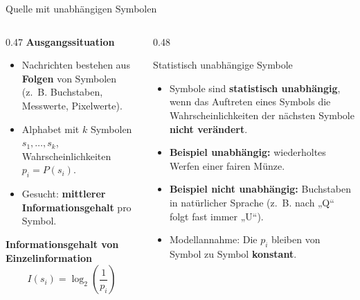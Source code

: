 \begin{frame}{Quelle mit unabhängigen Symbolen}
  \small
\begin{columns}[T]
  \begin{column}{0.47\textwidth}
    \textbf{Ausgangssituation}

    \begin{itemize}
      \item Nachrichten bestehen aus \textbf{Folgen} von Symbolen
            (z.~B. Buchstaben, Messwerte, Pixelwerte).
      \item Alphabet mit \(k\) Symbolen \(s_1,\dots,s_k\), Wahrscheinlichkeiten \(p_i = P(s_i)\).
      \item Gesucht: \textbf{mittlerer Informationsgehalt} pro Symbol.
    \end{itemize}

    \vspace{0.3cm}
    \textbf{Informationsgehalt von Einzelinformation}
    \[
      I(s_i) = \log_2\!\left(\frac{1}{p_i}\right)
    \]
  \end{column}

  \begin{column}{0.48\textwidth}
    \begin{blockDef}{\small Statistisch unabhängige Symbole}
      \begin{itemize}
        \item Symbole sind \textbf{statistisch unabhängig}, wenn das Auftreten eines Symbols
              die Wahrscheinlichkeiten der nächsten Symbole \textbf{nicht verändert}.
        \item \textbf{Beispiel unabhängig:}
              wiederholtes Werfen einer fairen Münze.
        \item \textbf{Beispiel nicht unabhängig:}
              Buchstaben in natürlicher Sprache (z.~B. nach „Q“ folgt fast immer „U“).
        \item Modellannahme: Die \(p_i\) bleiben von Symbol zu Symbol \textbf{konstant}.
      \end{itemize}
    \end{blockDef}
  \end{column}
\end{columns}
\end{frame}

